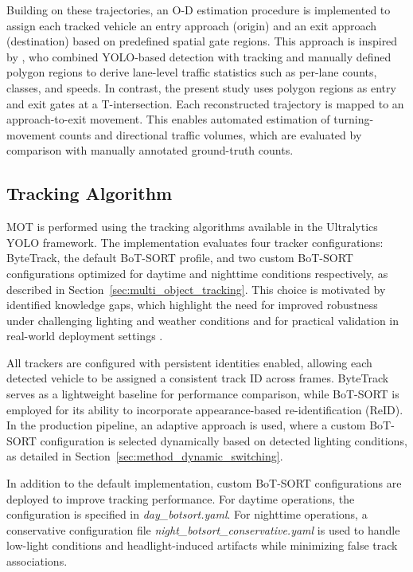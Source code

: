 Building on these trajectories, an O-D estimation procedure is implemented to assign each tracked vehicle an entry approach (origin) and an exit approach (destination) based on predefined spatial gate regions. This approach is inspired by \cite{Neupane2022RealTimeVehicle}, who combined YOLO-based detection with tracking and manually defined polygon regions to derive lane-level traffic statistics such as per-lane counts, classes, and speeds. In contrast, the present study uses polygon regions as entry and exit gates at a T-intersection. Each reconstructed trajectory is mapped to an approach-to-exit movement. This enables automated estimation of turning-movement counts and directional traffic volumes, which are evaluated by comparison with manually annotated ground-truth counts.

\subsection{Tracking Algorithm}
\label{sec:method_tracker}

MOT is performed using the tracking algorithms available in the Ultralytics YOLO framework. The implementation evaluates four tracker configurations: ByteTrack, the default BoT-SORT profile, and two custom BoT-SORT configurations optimized for daytime and nighttime conditions respectively, as described in Section~\ref{sec:multi_object_tracking}. This choice is motivated by identified knowledge gaps, which highlight the need for improved robustness under challenging lighting and weather conditions and for practical validation in real-world deployment settings \citep{DeepLearningTrafficScene2025,YOLO-PEL}.

All trackers are configured with persistent identities enabled, allowing each detected vehicle to be assigned a consistent track ID across frames. ByteTrack serves as a lightweight baseline for performance comparison, while BoT-SORT is employed for its ability to incorporate appearance-based re-identification (ReID). In the production pipeline, an adaptive approach is used, where a custom BoT-SORT configuration is selected dynamically based on detected lighting conditions, as detailed in Section~\ref{sec:method_dynamic_switching}.

In addition to the default implementation, custom BoT-SORT configurations are deployed to improve tracking performance. For daytime operations, the configuration is specified in \textit{day\_botsort.yaml}. For nighttime operations, a conservative configuration file \textit{night\_botsort\_conservative.yaml} is used to handle low-light conditions and headlight-induced artifacts while minimizing false track associations. 

